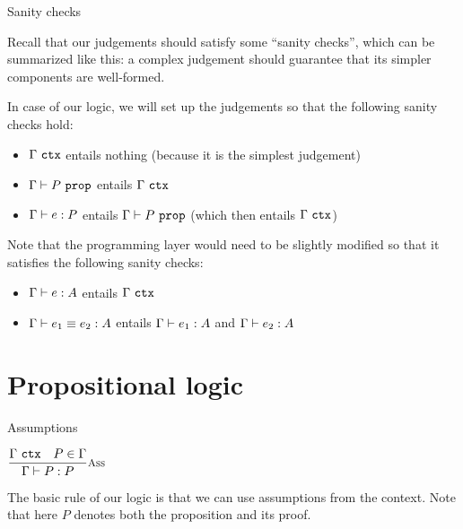 \documentclass{beamer}
\begin{document}
\begin{frame}{Sanity checks}

Recall that our judgements should satisfy some ``sanity checks'', which can be summarized like this: a complex judgement should guarantee that its simpler components are well-formed.

\vspace{1em}

In case of our logic, we will set up the judgements so that the following sanity checks hold:

\begin{itemize}
  \item $\Gamma\ \texttt{ctx}$ entails nothing (because it is the simplest judgement)
  \item $\prop[\Gamma]{P}$ entails $\Gamma\ \texttt{ctx}$
  \item $\proves{e}{P}$ entails $\prop[\Gamma]{P}$ (which then entails $\Gamma\ \texttt{ctx}$)
\end{itemize}

\vspace{1em}

Note that the programming layer would need to be slightly modified so that it satisfies the following sanity checks:

\begin{itemize}
  \item $\typing{e}{A}$ entails $\Gamma\ \texttt{ctx}$
  \item $\compeq{e_1}{e_2}{A}$ entails $\typing{e_1}{A}$ and $\typing{e_2}{A}$
\end{itemize}

\end{frame}

\section{Propositional logic}

\begin{frame}{Assumptions}

\begin{center}
  $\infrule[Ass]{\ctx{\Gamma} \quad \sidecond{P \in \Gamma}}{\proves{P}{P}}$
\end{center}

\vspace{2em}

The basic rule of our logic is that we can use assumptions from the context. Note that here $P$ denotes both the proposition and its proof.

\end{frame}
\end{document}
